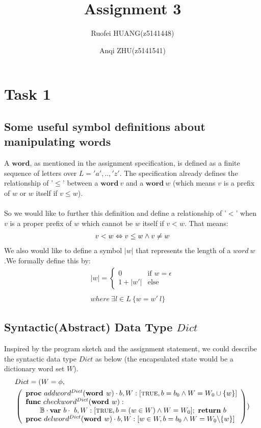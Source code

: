 \documentclass[a4paper,12pt,fleqn]{scrartcl}
\title{Assignment 3}
\author{Ruofei HUANG(z5141448)\and
Anqi ZHU(z5141541)
}
\newcommand{\WORD}{\textbf{word }}
\begin{document}
\maketitle
\section{Task 1}
\subsection{Some useful symbol definitions about manipulating $\textbf{word}$s }
A $\textbf{word}$, as mentioned in the assignment specification, is defined as a 
finite sequence of letters over $L = {'a', .., 'z'}$. The specification already 
defines the relationship of '$\leq$' between a $\textbf{word}\ v$ and a 
$\textbf{word}\ w$ (which means $v$ is a prefix of $w$ or $w$ itself if 
$v\leq w$). 
\\\\
So we would like to further this definition and define a relationship of '$<$' 
when $v$ is a proper prefix of $w$ which cannot be $w$ itself if $v < w$. That 
means:
\begin{align*}
    v < w \Leftrightarrow v\leq w \wedge v\neq w
\end{align*}
We also would like to define a symbol $|w|$ that represents the length of a 
$word\ w$.We formally define this by:
\begin{align*}
    |w| = 
    \begin{cases}
        0 & \text{if } w = \epsilon\\
        1 + |w'| & \text{else }
    \end{cases}\\\\
    where\ \exists l\in L\ \{w = w'\ l\}
\end{align*} 
\subsection{Syntactic(Abstract) Data Type $Dict$ }
Inspired by the program sketch and the assignment statement, we could describe 
the syntactic data type $Dict$ as below (the encapsulated state would be a 
dictionary word set $W$).
\begin{align*}
    &Dict = 
    (
        W = \phi,  \\
        &\left( 
            \begin{array}{l}
                \PROC\ addword^{Dict}(\WORD w)\cdot 
                b, W:[\True, b = b_0\And W = W_0\cup \{w\}]\\
                \FUNC\ checkword^{Dict}(\WORD w):\\
                    \qquad \mathbb{B}\cdot
                    \VAR\ b\cdot\ b, W:[\True, b = (w\in W)\And W = W_0];\ 
                    \RETURN\ b\\
                \PROC\ delword^{Dict}(\WORD w)\cdot
                b, W:[ w\in W, b = b_0\And W = W_0 \backslash \{w\}]
            \end{array}
        \right)
    )
\end{align*}
\end{document}
